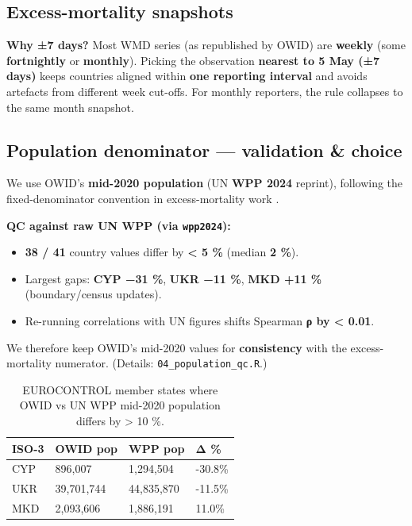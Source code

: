\documentclass[
  authoryear,
  preprint,
  3p,
  onecolumn]{elsarticle}
\providecommand{\tightlist}{%
  \setlength{\itemsep}{0pt}\setlength{\parskip}{0pt}}\usepackage{longtable,booktabs,array}
\begin{document}
\begin{longtable}[]
\end{longtable}

\subsection{Excess-mortality snapshots}\label{excess-snaps}

\textbf{Why ±7 days?} Most WMD series (as republished by OWID) are
\textbf{weekly} (some \textbf{fortnightly} or \textbf{monthly}). Picking
the observation \textbf{nearest to 5 May (±7 days)} keeps countries
aligned within \textbf{one reporting interval} and avoids artefacts from
different week cut-offs. For monthly reporters, the rule collapses to
the same month snapshot.
\citep{karlinsky2021, mathieu2021owidvaccinations}

\subsection{Population denominator --- validation \&
choice}\label{population-denominator-validation-choice}

We use OWID's \textbf{mid-2020 population} (UN \textbf{WPP 2024}
reprint), following the fixed-denominator convention in excess-mortality
work \citep{karlinsky2021, kelly2021}.

\textbf{QC against raw UN WPP (via \texttt{wpp2024}):}

\begin{itemize}
\tightlist
\item
  \textbf{38 / 41} country values differ by \textbf{\textless{} 5 \%}
  (median \textbf{2 \%}).
\item
  Largest gaps: \textbf{CYP −31 \%}, \textbf{UKR −11 \%}, \textbf{MKD
  +11 \%} (boundary/census updates).
\item
  Re-running correlations with UN figures shifts Spearman \textbf{ρ by
  \textless{} 0.01}.
\end{itemize}

We therefore keep OWID's mid-2020 values for \textbf{consistency} with
the excess-mortality numerator. (Details:
\texttt{04\_population\_qc.R}.)

\begin{longtable}[]{@{}llll@{}}

\caption{\label{tbl-big-gaps}EUROCONTROL member states where OWID vs UN
WPP mid-2020 population differs by \textgreater{} 10 \%.}

\tabularnewline

\toprule\noalign{}
ISO-3 & OWID pop & WPP pop & Δ \% \\
\midrule\noalign{}
\endhead
\bottomrule\noalign{}
\endlastfoot
CYP & 896,007 & 1,294,504 & -30.8\% \\
UKR & 39,701,744 & 44,835,870 & -11.5\% \\
MKD & 2,093,606 & 1,886,191 & 11.0\% \\

\end{longtable}
\end{document}
